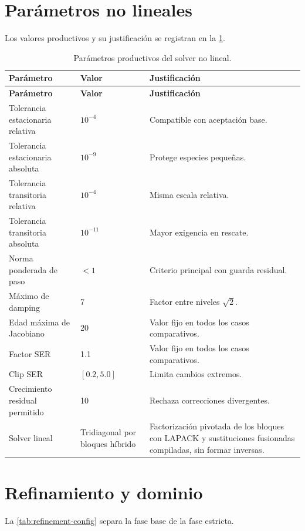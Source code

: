 \documentclass[12pt,a4paper,twoside,openany]{book}
\begin{document}
\section{Parámetros no lineales}

Los valores productivos y su justificación se registran en la \cref{tab:nonlinear-config}.

\begin{longtable}{@{}p{}p{}p{}@{}}
\caption{Parámetros productivos del solver no lineal.}
\label{tab:nonlinear-config}\\
\toprule
\textbf{Parámetro} & \textbf{Valor} & \textbf{Justificación} \\
\midrule
\endfirsthead
\toprule
\textbf{Parámetro} & \textbf{Valor} & \textbf{Justificación} \\
\midrule
\endhead
Tolerancia estacionaria relativa & \(10^{-4}\) & Compatible con aceptación base. \\
Tolerancia estacionaria absoluta & \(10^{-9}\) & Protege especies pequeñas. \\
Tolerancia transitoria relativa & \(10^{-4}\) & Misma escala relativa. \\
Tolerancia transitoria absoluta & \(10^{-11}\) & Mayor exigencia en rescate. \\
Norma ponderada de paso & \(<1\) & Criterio principal con guarda residual. \\
Máximo de damping & 7 & Factor entre niveles \(\sqrt{2}\). \\
Edad máxima de Jacobiano & 20 & Valor fijo en todos los casos comparativos. \\
Factor SER & 1.1 & Valor fijo en todos los casos comparativos. \\
Clip SER & \([0.2,5.0]\) & Limita cambios extremos. \\
Crecimiento residual permitido & 10 & Rechaza correcciones divergentes. \\
Solver lineal & Tridiagonal por bloques híbrido & Factorización pivotada de los
bloques con LAPACK y sustituciones fusionadas compiladas, sin formar inversas. \\
\bottomrule
\end{longtable}

\section{Refinamiento y dominio}

La \cref{tab:refinement-config} separa la fase base de la fase estricta.
\end{document}
